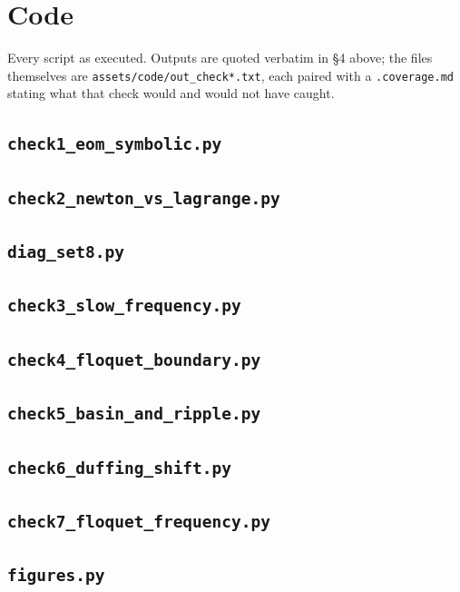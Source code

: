 \documentclass[11pt,a4paper]{article}
\begin{document}
\section{Code}\label{app:code}
Every script as executed. Outputs are quoted verbatim in \S4 above; the files themselves are \texttt{assets/code/out\_check*.txt}, each paired with a \texttt{.coverage.md} stating what that check would and would not have caught.

\subsection{\texttt{check1\_eom\_symbolic.py}}


\subsection{\texttt{check2\_newton\_vs\_lagrange.py}}


\subsection{\texttt{diag\_set8.py}}


\subsection{\texttt{check3\_slow\_frequency.py}}


\subsection{\texttt{check4\_floquet\_boundary.py}}


\subsection{\texttt{check5\_basin\_and\_ripple.py}}


\subsection{\texttt{check6\_duffing\_shift.py}}


\subsection{\texttt{check7\_floquet\_frequency.py}}


\subsection{\texttt{figures.py}}

\end{document}

